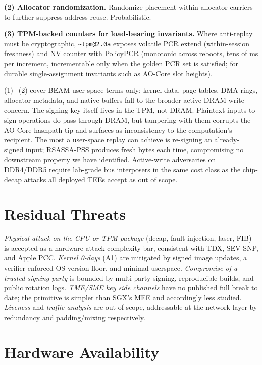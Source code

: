 \documentclass[10pt,a4paper]{article}
\begin{document}
\textbf{(2) Allocator randomization.} Randomize placement within
allocator carriers to further suppress address-reuse. Probabilistic.

\textbf{(3) TPM-backed counters for load-bearing invariants.} Where
anti-replay must be cryptographic, \texttt{\~{}tpm@2.0a} exposes
volatile PCR extend (within-session freshness) and NV counter with
PolicyPCR (monotonic across reboots, tens of ms per increment,
incrementable
only when the golden PCR set is satisfied; for durable single-assignment
invariants such as AO-Core slot heights).

(1)$+$(2) cover BEAM user-space terms only; kernel data, page tables,
DMA rings, allocator metadata, and native buffers fall to the broader
active-DRAM-write concern. The signing key itself lives in the TPM, not
DRAM. Plaintext inputs to sign operations do pass through DRAM, but
tampering with them corrupts the AO-Core hashpath tip and surfaces as
inconsistency to the computation's recipient. The most a user-space
replay can achieve is re-signing an already-signed input; RSASSA-PSS
produces fresh bytes each time, compromising no downstream property
we have identified. Active-write adversaries on DDR4/DDR5 require
lab-grade bus interposers in the same cost class as the chip-decap
attacks all deployed TEEs accept as out of scope.

\vspace{-0.3em}
\section{Residual Threats}
\vspace{-0.3em}

\emph{Physical attack on the CPU or TPM package} (decap, fault injection,
laser, FIB) is accepted as a hardware-attack-complexity bar, consistent
with TDX, SEV-SNP, and Apple PCC. \emph{Kernel 0-days} (A1) are mitigated
by signed image updates, a verifier-enforced OS version floor, and minimal
userspace. \emph{Compromise of a trusted signing party} is bounded by
multi-party signing, reproducible builds, and public rotation logs.
\emph{TME/SME key side channels} have no published full break to date; the
primitive is simpler than SGX's MEE and accordingly less studied.
\emph{Liveness} and \emph{traffic analysis} are out of scope, addressable
at the network layer by redundancy and padding/mixing respectively.

\vspace{-0.3em}
\section{Hardware Availability}
\label{sec:availability}
\vspace{-0.3em}
\end{document}
